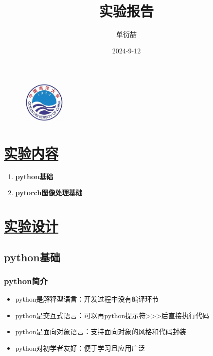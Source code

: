 \documentclass[a4paper,12pt]{article}
\begin{document}
\begin{figure}[t]
    \includegraphics[width=0.2\textwidth]{ouc.jpg}
\end{figure}

\title{实验报告}
\author{单衍喆 }
\date{2024-9-12}
\maketitle

\tableofcontents
\newpage


\section{\underline{\color{blue}实验内容}}

\begin{enumerate}
    \item \textbf{python基础}
    \item \textbf{pytorch图像处理基础}
\end{enumerate}

\section{\underline{\color{blue}实验设计}}
\subsection{\color{red}python基础}

\subsubsection{\color{green}python简介}

\begin{itemize}
    \item python是解释型语言：开发过程中没有编译环节
    \item python是交互式语言：可以再python提示符>>>后直接执行代码
    \item python是面向对象语言：支持面向对象的风格和代码封装
    \item python对初学者友好：便于学习且应用广泛
\end{itemize}
\end{document}

